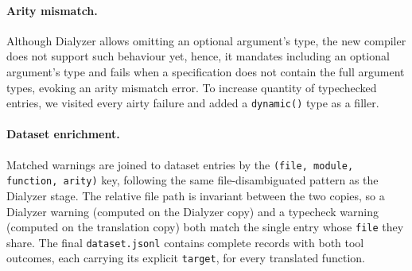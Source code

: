 \paragraph{Arity mismatch.}
Although Dialyzer allows omitting an optional argument's type, the new compiler does not support such behaviour yet, hence, it mandates including an optional argument's type and fails when a specification does not contain the full argument types, evoking an arity mismatch error.
To increase quantity of typechecked entries, we visited every airty failure and added a \texttt{dynamic()} type as a filler.

\paragraph{Dataset enrichment.}
Matched warnings are joined to dataset entries by the \texttt{(file, module, function, arity)} key, following the same file-disambiguated pattern as the Dialyzer stage.
The relative file path is invariant between the two copies, so a Dialyzer warning (computed on the Dialyzer copy) and a typecheck warning (computed on the translation copy) both match the single entry whose \texttt{file} they share.
The final \texttt{dataset.jsonl} contains complete records with both tool outcomes, each carrying its explicit \texttt{target}, for every translated function.





